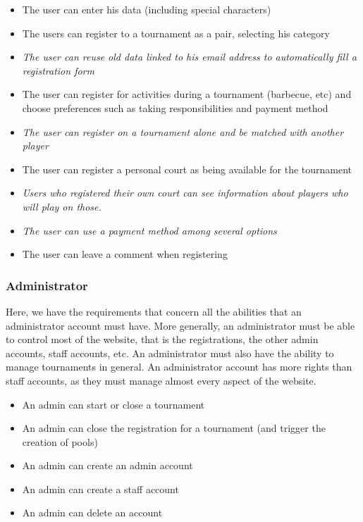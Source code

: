 \documentclass[a4paper, 12pt]{article}
\begin{document}
	\begin{itemize}
		\item The user can enter his data (including special characters) 
		\item The users can register to a tournament as a pair, selecting his category 
		\item \textit{The user can reuse old data linked to his email address to automatically fill a registration form}
		\item The user can register for activities during a tournament (barbecue, etc) and choose preferences such as taking responsibilities and payment method
		\item \textit{The user can register on a tournament alone and be matched with another player}
		\item The user can register a personal court as being available for the tournament
		\item \textit{Users who registered their own court can see information about players who will play on those.}
		\item \textit{The user can use a payment method among several options}
		\item The user can leave a comment when registering
	\end{itemize}

\subsubsection*{Administrator}
    Here, we have the requirements that concern all the abilities that an administrator account must have. More generally, an administrator must be able to control most of the website, that is the registrations, the other admin accounts, staff accounts, etc. An administrator must also have the ability to manage tournaments in general. An administrator account has more rights than staff accounts, as they must manage almost every aspect of the website.\\ 
    
    \begin{itemize}
    	\item An admin can start or close a tournament
    	\item An admin can close the registration for a tournament (and trigger the creation of pools)
    	\item An admin can create an admin account
		\item An admin can create a staff account
		\item An admin can delete an account

    \end{itemize}
    
\end{document}
